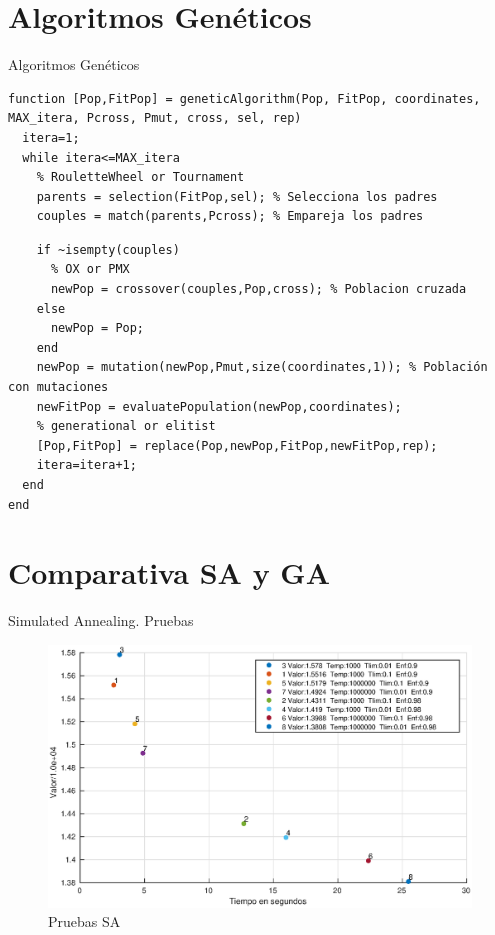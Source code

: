 \documentclass{beamer}
\begin{document}
\section{Algoritmos Genéticos}
\begin{frame}[fragile]{Algoritmos Genéticos}
\begin{verbatim}
function [Pop,FitPop] = geneticAlgorithm(Pop, FitPop, coordinates, MAX_itera, Pcross, Pmut, cross, sel, rep)
  itera=1;
  while itera<=MAX_itera
    % RouletteWheel or Tournament
    parents = selection(FitPop,sel); % Selecciona los padres
    couples = match(parents,Pcross); % Empareja los padres
\end{verbatim}
\end{frame}

\begin{frame}[fragile]
\begin{verbatim}
    if ~isempty(couples)
      % OX or PMX
      newPop = crossover(couples,Pop,cross); % Poblacion cruzada
    else
      newPop = Pop;
    end
    newPop = mutation(newPop,Pmut,size(coordinates,1)); % Población con mutaciones
    newFitPop = evaluatePopulation(newPop,coordinates);
    % generational or elitist
    [Pop,FitPop] = replace(Pop,newPop,FitPop,newFitPop,rep);
    itera=itera+1;
  end
end
\end{verbatim}
\end{frame}



\section{Comparativa SA y GA}
\begin{frame}{Simulated Annealing. Pruebas}
  \begin{center}
    \begin{figure}
      \includegraphics[scale=0.45]{../SA/statsSA.eps}
      \caption{Pruebas SA}
      \label{fig:statsSA}
    \end{figure}
  \end{center}
\end{frame}
\end{document}
